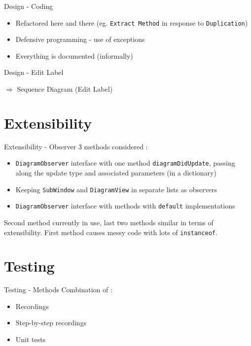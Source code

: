 \documentclass[10pt]{beamer}
\begin{document}
\begin{frame}[fragile]{Design - Coding}
\begin{itemize}
\item Refactored here and there (eg. \texttt{Extract Method} in response to \texttt{Duplication})
\item Defensive programming - use of exceptions
\item Everything is documented (informally)
\end{itemize}
\end{frame}

\begin{frame}[fragile]{Design - Edit Label}
\begin{center}
$\Rightarrow$ Sequence Diagram (Edit Label) 
\end{center}
\end{frame}

\section{Extensibility}

\begin{frame}[fragile]{Extensibility - Observer}
3 methods considered :
\begin{itemize}
\item \texttt{DiagramObserver} interface with one method \texttt{diagramDidUpdate}, passing along the update type and associated parameters (in a dictionary)
\item Keeping \texttt{SubWindow} and \texttt{DiagramView} in separate lists as observers
\item \texttt{DiagramObserver} interface with methods with \texttt{default} implementations
\end{itemize}
Second method currently in use, last two methods similar in terms of extensibility. First method causes messy code with lots of \texttt{instanceof}.
\end{frame}

\section{Testing}

\begin{frame}[fragile]{Testing - Methods}
Combination of :
\begin{itemize}
\item Recordings
\item Step-by-step recordings
\item Unit tests
\end{itemize}
\end{frame}
\end{document}
